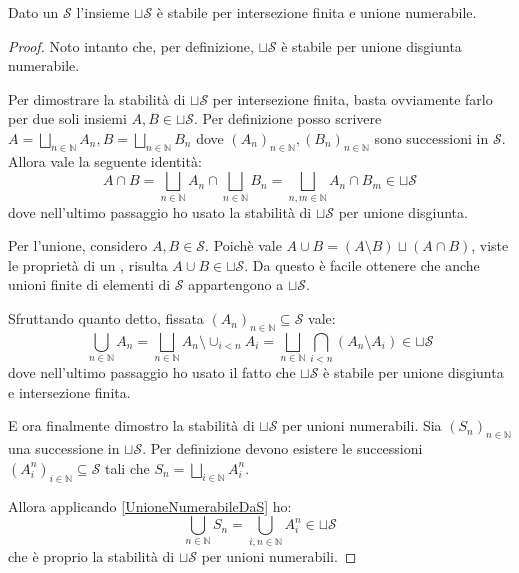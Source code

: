 \begin{proposition}\label{UnioneDisgiuntaQuasiAlgebra}
	Dato un \semiring{} $\mathcal S$ l'insieme $\sqcup\mathcal S$ è stabile per intersezione finita e unione numerabile.
\end{proposition}
\begin{proof}
	Noto intanto che, per definizione, $\sqcup\mathcal S$ è stabile per unione disgiunta numerabile.
	
	Per dimostrare la stabilità di $\sqcup\mathcal S$ per intersezione finita, basta ovviamente farlo per due soli insiemi $A,B\in\sqcup\mathcal S$. Per definizione posso scrivere $A=\bigsqcup_{n\in\mathbb N} A_n, B=\bigsqcup_{n\in\mathbb N} B_n$ dove $(A_n)_{n\in\mathbb N},(B_n)_{n\in\mathbb N}$ sono successioni in $\mathcal S$. Allora vale la seguente identità:
	\begin{equation*}
		A\cap B=\bigsqcup_{n\in\mathbb N} A_n\cap\bigsqcup_{n\in\mathbb N} B_n=
		\bigsqcup_{n,m\in\mathbb N} A_n\cap B_m\in\sqcup\mathcal S
	\end{equation*}
	dove nell'ultimo passaggio ho usato la stabilità di $\sqcup\mathcal S$ per unione disgiunta.
	
	Per l'unione, considero $A,B\in\mathcal S$. Poichè vale $A\cup B=(A\setminus B)\sqcup(A\cap B)$, viste le proprietà di un \semiring{}, risulta $A\cup B\in \sqcup\mathcal S$. Da questo è facile ottenere che anche unioni finite di elementi di $\mathcal S$ appartengono a $\sqcup\mathcal S$.
	
	Sfruttando quanto detto, fissata $(A_n)_{n\in\mathbb N}\subseteq\mathcal S$ vale:
	\begin{equation}\label{UnioneNumerabileDaS}
		\bigcup_{n\in\mathbb N} A_n=\bigsqcup_{n\in\mathbb N} A_n\setminus\cup_{i<n} A_i
		=\bigsqcup_{n\in\mathbb N} \bigcap_{i<n} (A_n\setminus A_i)\in\sqcup\mathcal S
	\end{equation}
	dove nell'ultimo passaggio ho usato il fatto che $\sqcup\mathcal S$ è stabile per unione disgiunta e intersezione finita.
	
	E ora finalmente dimostro la stabilità di $\sqcup\mathcal S$ per unioni numerabili. Sia $(S_n)_{n\in\mathbb N}$ una successione in $\sqcup\mathcal S$. Per definizione devono esistere le successioni $(A^n_i)_{i\in\mathbb N}\subseteq \mathcal S$ tali che $S_n=\bigsqcup_{i\in\mathbb N} A^n_i$.
	
	Allora applicando \cref{UnioneNumerabileDaS} ho:
	\begin{equation*}
		\bigcup_{n\in\mathbb N}S_n=\bigcup_{i,n\in\mathbb N}A^n_i\in\sqcup\mathcal S 
	\end{equation*}
	che è proprio la stabilità di $\sqcup\mathcal S$ per unioni numerabili.

\end{proof}

